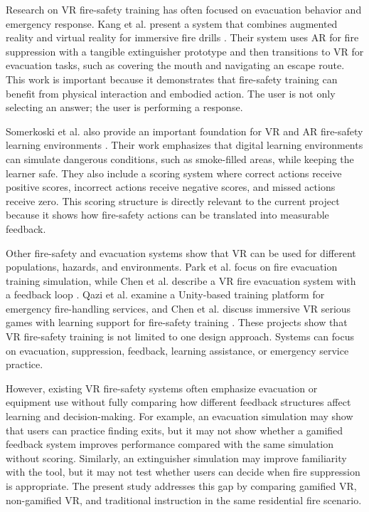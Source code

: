 \documentclass[manuscript, review]{acmart}
\begin{document}
{Research on VR fire-safety training has often focused on evacuation behavior and emergency response. Kang et al. present a system that combines augmented reality and virtual reality for immersive fire drills \cite{kang2022combining}. Their system uses AR for fire suppression with a tangible extinguisher prototype and then transitions to VR for evacuation tasks, such as covering the mouth and navigating an escape route. This work is important because it demonstrates that fire-safety training can benefit from physical interaction and embodied action. The user is not only selecting an answer; the user is performing a response.

Somerkoski et al. also provide an important foundation for VR and AR fire-safety learning environments \cite{somerkoski2020digital}. Their work emphasizes that digital learning environments can simulate dangerous conditions, such as smoke-filled areas, while keeping the learner safe. They also include a scoring system where correct actions receive positive scores, incorrect actions receive negative scores, and missed actions receive zero. This scoring structure is directly relevant to the current project because it shows how fire-safety actions can be translated into measurable feedback.

Other fire-safety and evacuation systems show that VR can be used for different populations, hazards, and environments. Park et al. focus on fire evacuation training simulation, while Chen et al. describe a VR fire evacuation system with a feedback loop \cite{park2017development,chen2020design}. Qazi et al. examine a Unity-based training platform for emergency fire-handling services, and Chen et al. discuss immersive VR serious games with learning support for fire-safety training \cite{qazi2023developing,chen2022immersive}. These projects show that VR fire-safety training is not limited to one design approach. Systems can focus on evacuation, suppression, feedback, learning assistance, or emergency service practice.

However, existing VR fire-safety systems often emphasize evacuation or equipment use without fully comparing how different feedback structures affect learning and decision-making. For example, an evacuation simulation may show that users can practice finding exits, but it may not show whether a gamified feedback system improves performance compared with the same simulation without scoring. Similarly, an extinguisher simulation may improve familiarity with the tool, but it may not test whether users can decide when fire suppression is appropriate. The present study addresses this gap by comparing gamified VR, non-gamified VR, and traditional instruction in the same residential fire scenario.

}
\end{document}

